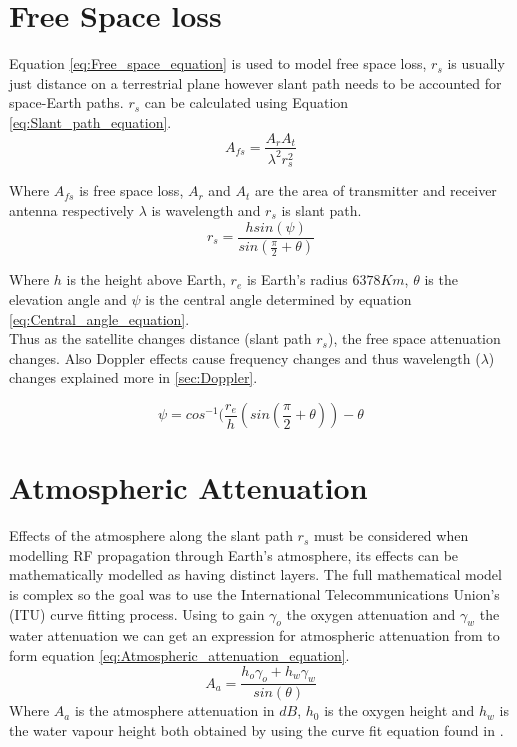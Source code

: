 \documentclass[conference]{IEEEtran}
\begin{document}
\section{Free Space loss}
Equation \ref{eq:Free_space_equation} is used to model free space loss, $r_s$ is usually just distance on a terrestrial plane however slant path needs to be accounted for space-Earth paths. $r_s$ can be calculated using Equation \ref{eq:Slant_path_equation}.\\
\begin{equation}
A_{fs} = \frac{A_r A_t}{\lambda^2 r_s^2}
\label{eq:Free_space_equation}
\end{equation}

Where $A_{fs}$ is free space loss, $A_r$ and $A_t$ are the area of transmitter and receiver antenna respectively $\lambda$ is wavelength and $r_s$ is slant path.\\


\begin{equation}
r_s = \frac{h sin(\psi)}{sin(\frac{\pi}{2}+\theta)}
\label{eq:Slant_path_equation}
\end{equation}

Where $h$ is the height above Earth, $r_e$ is Earth's radius $6378K m$, $\theta$ is the elevation angle and $\psi$ is the central angle determined by equation \ref{eq:Central_angle_equation}.\\

Thus as the satellite changes distance (slant path $r_s$), the free space attenuation changes. Also Doppler effects cause frequency changes and thus wavelength ($\lambda$) changes explained more in \ref{sec:Doppler}.  

\begin{equation}
\psi = cos^{-1}(\frac{r_e}{h}(sin(\frac{\pi}{2}+\theta))-\theta
\label{eq:Central_angle_equation}
\end{equation}

\label{sec:Free_space}

\section{Atmospheric Attenuation}
Effects of the atmosphere along the slant path $r_s$ must be considered when modelling RF propagation through Earth's atmosphere, its effects can be mathematically modelled as having distinct layers. The full mathematical model is complex so the goal was to use the International Telecommunications Union's (ITU) curve fitting process. Using \cite{ITU-R_P.676-5} to gain $\gamma_{o}$ the oxygen attenuation and $\gamma_w$ the water attenuation we can get an expression for atmospheric attenuation from \cite{ITU-R_P.618-7} to form equation \ref{eq:Atmospheric_attenuation_equation}.
\begin{equation}
A_a = \frac{h_o \gamma_o + h_w \gamma_w}{sin(\theta)}
\label{eq:Atmospheric_attenuation_equation}
\end{equation}
Where $A_a$ is the atmosphere attenuation in $dB$, $h_0$ is the oxygen height and $h_w$ is the water vapour height both obtained by using the curve fit equation found in \cite{ITU-R_P.618-7}.
\end{document}
